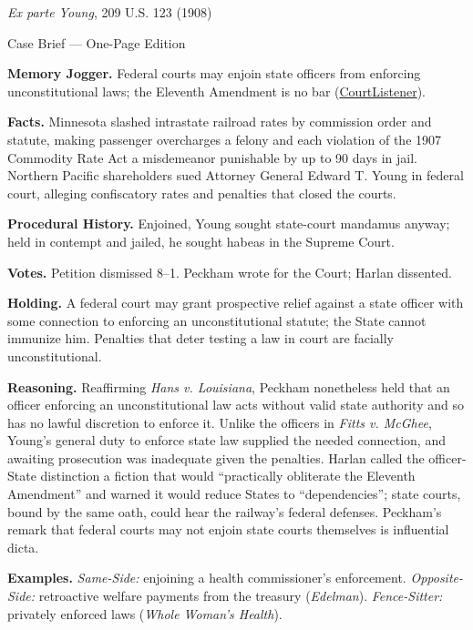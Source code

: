 \documentclass[12pt]{article}
\begin{document}
\begin{center}
{\Large \textit{Ex parte Young}, 209 U.S. 123 (1908)\par}
\vspace{0.3em}
{\normalsize Case Brief --- One-Page Edition\par}
\end{center}

\textbf{Memory Jogger.} Federal courts may enjoin state officers from enforcing unconstitutional laws; the Eleventh Amendment is no bar (\href{https://www.courtlistener.com/opinion/96819/ex-parte-young/}{CourtListener}).

\textbf{Facts.} Minnesota slashed intrastate railroad rates by commission order and statute, making passenger overcharges a felony and each violation of the 1907 Commodity Rate Act a misdemeanor punishable by up to 90 days in jail. Northern Pacific shareholders sued Attorney General Edward T. Young in federal court, alleging confiscatory rates and penalties that closed the courts.

\textbf{Procedural History.} Enjoined, Young sought state-court mandamus anyway; held in contempt and jailed, he sought habeas in the Supreme Court.

\textbf{Votes.} Petition dismissed 8--1. Peckham wrote for the Court; Harlan dissented.

\textbf{Holding.} A federal court may grant prospective relief against a state officer with some connection to enforcing an unconstitutional statute; the State cannot immunize him. Penalties that deter testing a law in court are facially unconstitutional.

\textbf{Reasoning.} Reaffirming \textit{Hans v. Louisiana}, Peckham nonetheless held that an officer enforcing an unconstitutional law acts without valid state authority and so has no lawful discretion to enforce it. Unlike the officers in \textit{Fitts v. McGhee}, Young's general duty to enforce state law supplied the needed connection, and awaiting prosecution was inadequate given the penalties. Harlan called the officer-State distinction a fiction that would ``practically obliterate the Eleventh Amendment'' and warned it would reduce States to ``dependencies''; state courts, bound by the same oath, could hear the railway's federal defenses. Peckham's remark that federal courts may not enjoin state courts themselves is influential dicta.

\textbf{Examples.} \emph{Same-Side:} enjoining a health commissioner's enforcement. \emph{Opposite-Side:} retroactive welfare payments from the treasury (\textit{Edelman}). \emph{Fence-Sitter:} privately enforced laws (\textit{Whole Woman's Health}).
\end{document}
